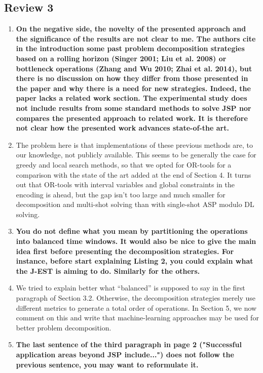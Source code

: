 \documentclass[11pt]{article}
\begin{document}
\subsection*{Review 3}
\begin{enumerate}[wide, labelwidth=!, labelindent=0pt]
\item \textbf{%
      On the negative side, the novelty of the presented approach and the significance of the results are not clear to me. The authors cite in the introduction some past problem decomposition strategies based on a rolling horizon (Singer 2001; Liu et al. 2008) or bottleneck operations (Zhang and Wu 2010; Zhai et al. 2014), but there is no discussion on how they differ from those presented in the paper and why there is a need for new strategies. Indeed, the paper lacks a related work section. The experimental study does not include results from some standard methods to solve JSP nor compares the presented approach to related work. It is therefore not clear how the presented work advances state-of-the art.}
\item[] The problem here is that implementations of these previous methods are, to our knowledge,
        not publicly available. This seems to be generally the case for greedy and local search
		methods, so that we opted for OR-tools for a comparison with the state of the art added at the end of Section 4.
		It turns out that OR-tools with interval variables and global constraints in the encoding
		is ahead, but the gap isn't too large and much smaller for decomposition and multi-shot
		solving than with single-shot ASP modulo DL solving.
\item \textbf{%
      You do not define what you mean by partitioning the operations into balanced time windows. It would also be nice to give the main idea first before presenting the decomposition strategies. For instance, before start explaining Listing 2, you could explain what the J-EST is aiming to do. Similarly for the others.}
\item[] We tried to explain better what ``balanced'' is supposed to say in the first paragraph of Section 3.2.
        Otherwise, the decomposition strategies merely use different metrics to generate a total order of operations.
		In Section 5, we now comment on this and write that machine-learning approaches may be
		used for better problem decomposition.
\item \textbf{The last sentence of the third paragraph in page 2 ("Successful application areas beyond JSP include...") does not follow the previous sentence, you may want to reformulate it.}

\end{enumerate}
\end{document}
